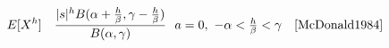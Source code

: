 \begin{table*}[p]
\begin{align*}
\\
E[ X^h]  \quad & \frac{|s|^h B(\alpha+\tfrac{h}{\beta},\gamma- \tfrac{h}{\beta}) }{B(\alpha,\gamma)} 
& \!\!a=0,\  -\alpha< \tfrac{h}{\beta} <\gamma \quad   \text{\cite{McDonald1984}} 
\end{align*}
\end{table*}


